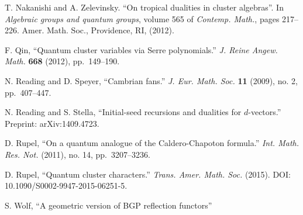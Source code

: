 \documentclass{amsart}
\begin{document}
\begin{thebibliography}{99}

   T. Nakanishi and A. Zelevinsky. ``On tropical dualities in cluster algebras''. In {\em Algebraic groups and quantum groups}, volume 565 of {\em Contemp. Math.}, pages 217–226. Amer. Math. Soc., Providence, RI, (2012).



  F. Qin, ``Quantum cluster variables via Serre polynomials.''  {\em J. Reine Angew. Math.} \textbf{668} (2012), pp.~149--190.

  N. Reading and D. Speyer, ``Cambrian fans.'' {\em J. Eur. Math. Soc.} \textbf{11} (2009), no. 2, pp.~407--447.

  N. Reading and S. Stella, ``Initial-seed recursions and dualities for $d$-vectors.'' Preprint: arXiv:1409.4723.
   
  D. Rupel, ``On a quantum analogue of the Caldero-Chapoton formula.'' {\em Int. Math. Res. Not.} (2011), no. 14, pp.~3207--3236.

  D. Rupel, ``Quantum cluster characters.'' {\em Trans. Amer. Math. Soc.} (2015). DOI: 10.1090/S0002-9947-2015-06251-5.

  S. Wolf, ``A geometric version of BGP reflection functors''

\end{thebibliography}
\end{document}
